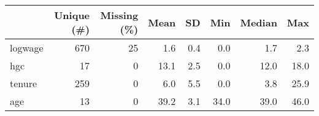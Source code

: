 \begin{table}[H]
\centering
\begin{tabular}[t]{lrrrrrrr}
\toprule
  & Unique (\#) & Missing (\%) & Mean & SD & Min & Median & Max\\
\midrule
logwage & 670 & 25 & 1.6 & 0.4 & 0.0 & 1.7 & 2.3\\
hgc & 17 & 0 & 13.1 & 2.5 & 0.0 & 12.0 & 18.0\\
tenure & 259 & 0 & 6.0 & 5.5 & 0.0 & 3.8 & 25.9\\
age & 13 & 0 & 39.2 & 3.1 & 34.0 & 39.0 & 46.0\\
\bottomrule
\end{tabular}
\end{table}
